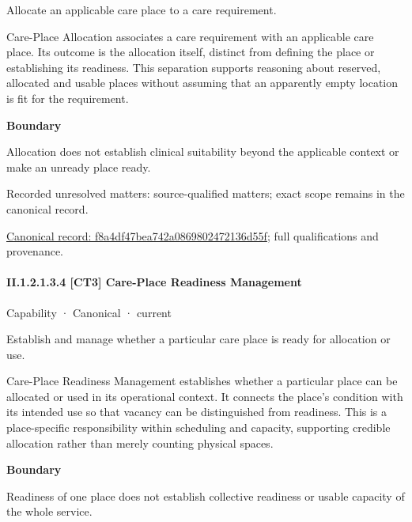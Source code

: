 Allocate an applicable care place to a care requirement.



Care-Place Allocation associates a care requirement with an applicable care place. Its outcome is the allocation itself, distinct from defining the place or establishing its readiness. This separation supports reasoning about reserved, allocated and usable places without assuming that an apparently empty location is fit for the requirement.



\textbf{Boundary}



Allocation does not establish clinical suitability beyond the applicable context or make an unready place ready.


{\small Recorded unresolved matters: source-qualified matters; exact scope remains in the canonical record.}\par
{\footnotesize \href{../../../../../../../continuum/strategy/capability/f8a4df47bea742a0869802472136d55f.md}{Canonical record: f8a4df47bea742a0869802472136d55f}; full qualifications and provenance.}\par
\paragraph*{II.1.2.1.3.4 [CT3] Care-Place Readiness Management}
\label{navigation:II.1.2.1.3.4}

\label{element:4dd0f1b9f9334c5c80066a8974fdfb7a}
{\small Capability · Canonical · current}\par

Establish and manage whether a particular care place is ready for allocation or use.



Care-Place Readiness Management establishes whether a particular place can be allocated or used in its operational context. It connects the place's condition with its intended use so that vacancy can be distinguished from readiness. This is a place-specific responsibility within scheduling and capacity, supporting credible allocation rather than merely counting physical spaces.



\textbf{Boundary}



Readiness of one place does not establish collective readiness or usable capacity of the whole service.


